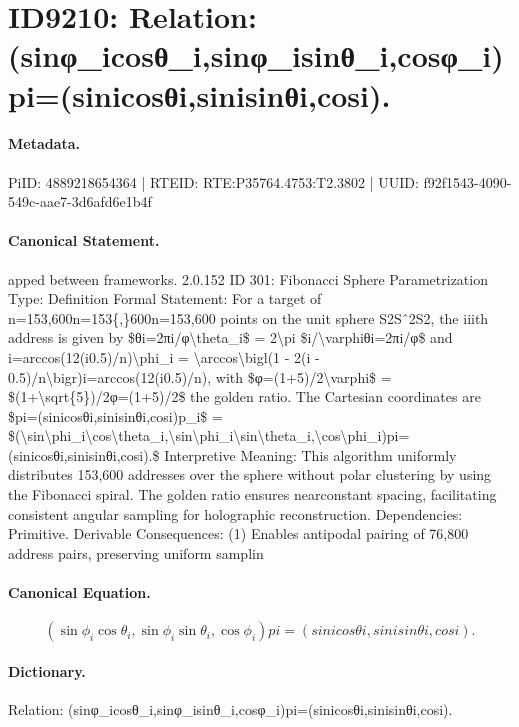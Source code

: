 \section*{ID9210: Relation: (sinφ\_icosθ\_i,sinφ\_isinθ\_i,cosφ\_i)pi=(sinicosθi,sinisinθi,cosi).}
\paragraph{Metadata.}
PiID: 4889218654364 | RTEID: RTE:P35764.4753:T2.3802 | UUID: f92f1543-4090-549c-aae7-3d6afd6e1b4f

\paragraph{Canonical Statement.}
apped between frameworks. 2.0.152 ID 301: Fibonacci Sphere Parametrization Type: Definition Formal Statement: For a target of n=153,600n=153\{,\}600n=153,600 points on the unit sphere S2Sˆ2S2, the iiith address is given by \$θi=2πi/φ\textbackslash{}theta\_i\$ = 2\textbackslash{}pi \$i/\textbackslash{}varphiθi=2πi/φ\$ and i=arccos(12(i0.5)/n)\textbackslash{}phi\_i = \textbackslash{}arccos\textbackslash{}bigl(1 - 2(i - 0.5)/n\textbackslash{}bigr)i=arccos(12(i0.5)/n), with \$φ=(1+5)/2\textbackslash{}varphi\$ = \$(1+\textbackslash{}sqrt\{5\})/2φ=(1+5)/2\$ the golden ratio. The Cartesian coordinates are \$pi=(sinicosθi,sinisinθi,cosi)p\_i\$ = \$(\textbackslash{}sin\textbackslash{}phi\_i\textbackslash{}cos\textbackslash{}theta\_i,\textbackslash{}sin\textbackslash{}phi\_i\textbackslash{}sin\textbackslash{}theta\_i,\textbackslash{}cos\textbackslash{}phi\_i)pi=(sinicosθi,sinisinθi,cosi).\$ Interpretive Meaning: This algorithm uniformly distributes 153,600 addresses over the sphere without polar clustering by using the Fibonacci spiral. The golden ratio ensures nearconstant spacing, facilitating consistent angular sampling for holographic reconstruction. Dependencies: Primitive. Derivable Consequences: (1) Enables antipodal pairing of 76,800 address pairs, preserving uniform samplin

\paragraph{Canonical Equation.}
\[
(\sin\phi_i\cos\theta_i,\sin\phi_i\sin\theta_i,\cos\phi_i)pi=(sinicosθi,sinisinθi,cosi).
\]

\paragraph{Dictionary.}
Relation: (sinφ\_icosθ\_i,sinφ\_isinθ\_i,cosφ\_i)pi=(sinicosθi,sinisinθi,cosi).

